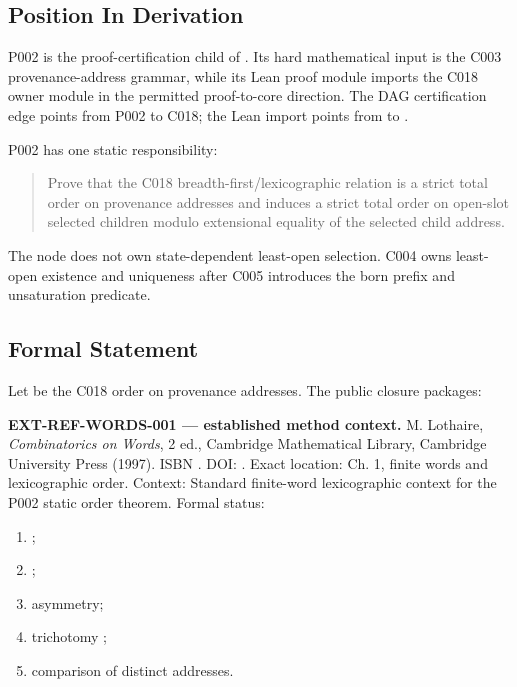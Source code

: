 \subsection{Position In Derivation}\label{position-in-derivation-3}

P002 is the proof-certification child of \texttt{\protect{}}. Its hard
mathematical input is the C003 provenance-address grammar, while its
Lean proof module imports the C018 owner module in the permitted
proof-to-core direction. The DAG certification edge points from P002 to
C018; the Lean import points from \texttt{\protect{}} to
\texttt{\protect{}}.

P002 has one static responsibility:

\begin{quote}
Prove that the C018 breadth-first/lexicographic relation is a strict
total order on provenance addresses and induces a strict total order on
open-slot selected children modulo extensional equality of the selected
child address.
\end{quote}

The node does not own state-dependent least-open selection. C004 owns
least-open existence and uniqueness after C005 introduces the born
prefix and unsaturation predicate.

\subsection{Formal Statement}\label{formal-statement-1}

Let \texttt{\protect{}} be the C018 order on provenance addresses. The
public closure packages:

\textbf{EXT-REF-WORDS-001 --- established method context.} M. Lothaire,
\emph{Combinatorics on Words}, 2 ed., Cambridge Mathematical Library,
Cambridge University Press (1997). ISBN \texttt{\protect{}}. DOI:
\texttt{\protect{}}. Exact location: Ch. 1, finite words
and lexicographic order. Context: Standard finite-word lexicographic
context for the P002 static order theorem. Formal status:
\texttt{\protect{}}

\begin{enumerate}
\def\labelenumi{\arabic{enumi}.}
\tightlist
\item
  \texttt{\protect{}};
\item
  \texttt{\protect{}};
\item
  asymmetry;
\item
  trichotomy
  \texttt{\protect{}};
\item
  comparison of distinct addresses.
\end{enumerate}

